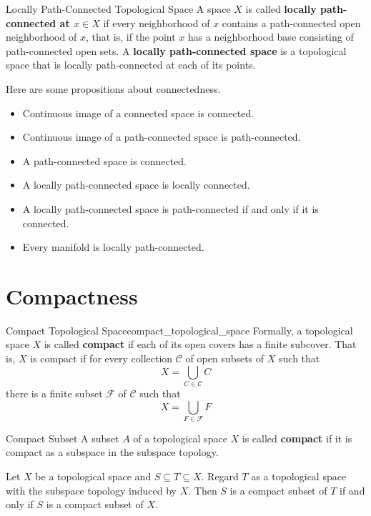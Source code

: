 \documentclass{report}
\begin{document}
\begin{definition}{Locally Path-Connected Topological Space}{}
	A space $X$ is called \textbf{locally path-connected at $x\in X$} if every neighborhood of $x$ contains a path-connected open neighborhood of $x$, that is, if the point $x$ has a neighborhood base consisting of path-connected open sets. A \textbf{locally path-connected space} is a topological space that is locally path-connected at each of its points.
\end{definition}


\begin{proposition}{}{}
	Here are some propositions about connectedness.
	\begin{itemize}
		\item Continuous image of a connected space is connected. 
		\item Continuous image of a path-connected space is path-connected.
		\item A path-connected space is connected.
		\item A locally path-connected space is locally connected.
		\item A locally path-connected space is path-connected if and only if it is connected.
		\item Every manifold is locally path-connected.
	\end{itemize}
	
\end{proposition}


\section{Compactness}
\begin{definition}{Compact Topological Space}{compact_topological_space}
	Formally, a topological space $X$ is called \textbf{compact} if each of its open covers has a finite subcover. That is, $X$ is compact if for every collection $\mathcal{C}$ of open subsets of $X$ such that
	\[
		X=\bigcup_{C \in \mathcal{C}} C
	\]
	there is a finite subset $\mathcal{F}$ of $\mathcal{C}$ such that
	\[
		X=\bigcup_{F \in \mathcal{F}} F
	\]
\end{definition}

\begin{definition}{Compact Subset}{}
	A subset $A$ of a topological space $X$ is called \textbf{compact} if it is compact as a subspace in the subspace topology.
\end{definition}


\begin{lemma}{}{}
	Let $X$ be a topological space and $S \subseteq T \subseteq X$. Regard $T$ as a topological space with the subspace topology induced by $X$. Then $S$ is a compact subset of $T$ if and only if $S$ is a compact subset of $X$.
\end{lemma}
\end{document}
